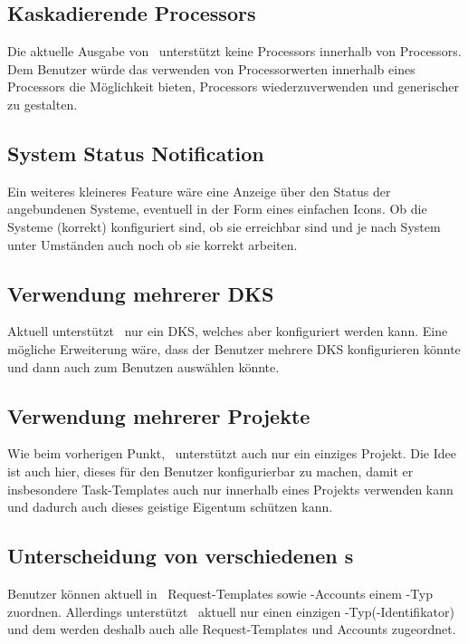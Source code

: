 			
		\subsection{Kaskadierende Processors}
			Die aktuelle Ausgabe von \eeppi\ unterstützt keine Processors innerhalb von Processors.
			Dem Benutzer würde das verwenden von Processorwerten innerhalb eines Processors die Möglichkeit bieten, Processors wiederzuverwenden und generischer zu gestalten.
			
			
		\subsection{System Status Notification}
			Ein weiteres kleineres Feature wäre eine Anzeige über den Status der angebundenen Systeme,
			eventuell in der Form eines einfachen Icons.
			Ob die Systeme (korrekt) konfiguriert sind, ob sie erreichbar sind
			und je nach System unter Umständen auch noch ob sie korrekt arbeiten.
		
		
		
	
		\subsection{Verwendung mehrerer DKS}
			Aktuell unterstützt \eeppi\ nur ein DKS, welches aber konfiguriert werden kann.
			Eine mögliche Erweiterung wäre, dass der Benutzer mehrere DKS konfigurieren könnte
			und dann auch zum Benutzen auswählen könnte.
		
		
		\subsection{Verwendung mehrerer Projekte}
			Wie beim vorherigen Punkt, \eeppi\ unterstützt auch nur ein einziges Projekt.
			Die Idee ist auch hier, dieses für den Benutzer konfigurierbar zu machen,
			damit er insbesondere Task-Templates auch nur innerhalb eines Projekts verwenden kann
			und dadurch auch dieses geistige Eigentum schützen kann.


		\subsection{Unterscheidung von verschiedenen \ppt s}
			Benutzer können aktuell in \eeppi\ Request-Templates sowie \ppt-Accounts einem \ppt-Typ zuordnen.
			Allerdings unterstützt \eeppi\ aktuell nur einen einzigen \ppt-Typ(-Identifikator)
			und dem werden deshalb auch alle Request-Templates und Accounts zugeordnet.
			
